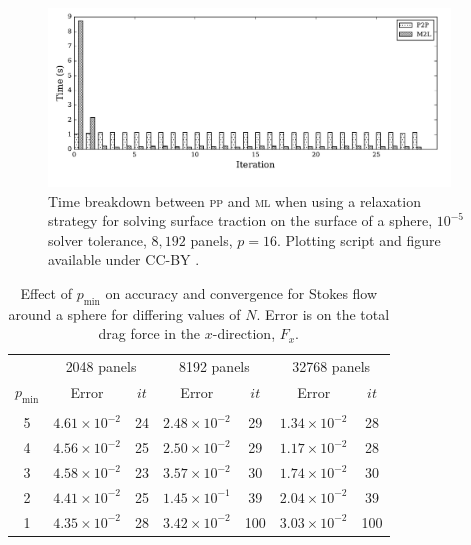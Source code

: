 \documentclass[final,3p,times]{elsarticle}
\newcommand{\mtol}{\textsc{m}\texttwooldstyle\textsc{l}\xspace} %
\newcommand{\ptop}{\textsc{p}\texttwooldstyle\textsc{p}\xspace} %
\newcommand{\pmin}{p_{\text{min}}}
\begin{document}
\begin{figure}%
\begin{center}
	\includegraphics[natwidth=9in,natheight=4in,width=0.95\textwidth]{StokesSolveBreakdown.pdf}
	\caption{Time breakdown between {\ptop} and {\mtol} when using a relaxation strategy for solving surface traction on the surface of a sphere, $10^{-5}$ solver tolerance, $8,192$ panels, $p=16$. Plotting script and figure available under CC-BY \cite{WangLaytonBarba2016-figshare3}.}
	\label{fig:stokes_relaxation_breakdown}
\end{center}
\end{figure}



\begin{table}[ht]
\footnotesize
\begin{center}
\begin{tabular}{c|cc|cc|cc}
  & \multicolumn{2}{c|}{2048 panels} & \multicolumn{2}{c|}{8192 panels} & \multicolumn{2}{c}{32768 panels} \\
 $\pmin$ & Error & $it$ & Error & $it$ & Error & $it$ \\ \hline
  & & & & & & \\
 5 & $4.61\times 10^{-2}$ & 24 & $2.48\times 10^{-2}$ & 29 & $1.34\times 10^{-2}$ & 28 \\
 4 & $4.56\times 10^{-2}$ & 25 & $2.50\times 10^{-2}$ & 29 & $1.17\times 10^{-2}$ & 28 \\
 3 & $4.58\times 10^{-2}$ & 23 & $3.57\times 10^{-2}$ & 30 & $1.74\times 10^{-2}$ & 30 \\
 2 & $4.41\times 10^{-2}$ & 25 & $1.45\times 10^{-1}$ & 39 & $2.04\times 10^{-2}$ & 39 \\
 1 & $4.35\times 10^{-2}$ & 28 & $3.42\times 10^{-2}$ & 100\footnotemark[1] & $3.03\times 10^{-2}$ & 100\footnotemark[1] 
\end{tabular}
\end{center}
\caption{Effect of $p_{\text{min}}$ on accuracy and convergence for Stokes flow around a sphere for differing values of $N$. Error is on the total drag force in the $x$-direction, $F_x$.}
\label{tab:stokes_min_p}
\end{table}%
\end{document}
